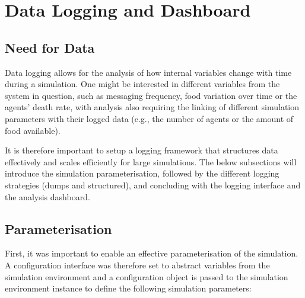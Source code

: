 \chapter{Data Logging and Dashboard}\label{data_logging}

\section{Need for Data}

Data logging allows for the analysis of how internal variables change with time during a simulation. One might be interested in different variables from the system in question, such as messaging frequency, food variation over time or the agents' death rate, with analysis also requiring the linking of different simulation parameters with their logged data (e.g., the number of agents or the amount of food available). 

It is therefore important to setup a logging framework that structures data effectively and scales efficiently for large simulations. The below subsections will introduce the simulation parameterisation, followed by the different logging strategies (dumps and structured), and concluding with the logging interface and the analysis dashboard.

\section{Parameterisation}

First, it was important to enable an effective parameterisation of the simulation. A configuration interface was therefore set to abstract variables from the simulation environment and a configuration object is passed to the simulation environment instance to define the following simulation parameters:

